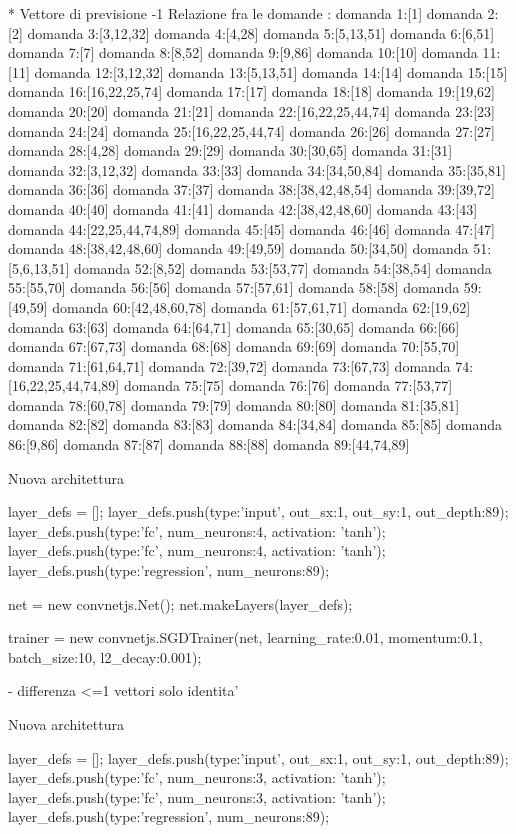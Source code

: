 * Vettore di previsione -1
Relazione fra le domande :
domanda 1:[1]
domanda 2:[2]
domanda 3:[3,12,32]
domanda 4:[4,28]
domanda 5:[5,13,51]
domanda 6:[6,51]
domanda 7:[7]
domanda 8:[8,52]
domanda 9:[9,86]
domanda 10:[10]
domanda 11:[11]
domanda 12:[3,12,32]
domanda 13:[5,13,51]
domanda 14:[14]
domanda 15:[15]
domanda 16:[16,22,25,74]
domanda 17:[17]
domanda 18:[18]
domanda 19:[19,62]
domanda 20:[20]
domanda 21:[21]
domanda 22:[16,22,25,44,74]
domanda 23:[23]
domanda 24:[24]
domanda 25:[16,22,25,44,74]
domanda 26:[26]
domanda 27:[27]
domanda 28:[4,28]
domanda 29:[29]
domanda 30:[30,65]
domanda 31:[31]
domanda 32:[3,12,32]
domanda 33:[33]
domanda 34:[34,50,84]
domanda 35:[35,81]
domanda 36:[36]
domanda 37:[37]
domanda 38:[38,42,48,54]
domanda 39:[39,72]
domanda 40:[40]
domanda 41:[41]
domanda 42:[38,42,48,60]
domanda 43:[43]
domanda 44:[22,25,44,74,89]
domanda 45:[45]
domanda 46:[46]
domanda 47:[47]
domanda 48:[38,42,48,60]
domanda 49:[49,59]
domanda 50:[34,50]
domanda 51:[5,6,13,51]
domanda 52:[8,52]
domanda 53:[53,77]
domanda 54:[38,54]
domanda 55:[55,70]
domanda 56:[56]
domanda 57:[57,61]
domanda 58:[58]
domanda 59:[49,59]
domanda 60:[42,48,60,78]
domanda 61:[57,61,71]
domanda 62:[19,62]
domanda 63:[63]
domanda 64:[64,71]
domanda 65:[30,65]
domanda 66:[66]
domanda 67:[67,73]
domanda 68:[68]
domanda 69:[69]
domanda 70:[55,70]
domanda 71:[61,64,71]
domanda 72:[39,72]
domanda 73:[67,73]
domanda 74:[16,22,25,44,74,89]
domanda 75:[75]
domanda 76:[76]
domanda 77:[53,77]
domanda 78:[60,78]
domanda 79:[79]
domanda 80:[80]
domanda 81:[35,81]
domanda 82:[82]
domanda 83:[83]
domanda 84:[34,84]
domanda 85:[85]
domanda 86:[9,86]
domanda 87:[87]
domanda 88:[88]
domanda 89:[44,74,89]


Nuova architettura

layer_defs = [];
layer_defs.push({type:'input', out_sx:1, out_sy:1, out_depth:89});
layer_defs.push({type:'fc', num_neurons:4, activation: 'tanh'});
layer_defs.push({type:'fc', num_neurons:4, activation: 'tanh'});
layer_defs.push({type:'regression', num_neurons:89});

net = new convnetjs.Net();
net.makeLayers(layer_defs);

trainer = new convnetjs.SGDTrainer(net, {learning_rate:0.01, momentum:0.1, batch_size:10, l2_decay:0.001});

- differenza <=1 vettori solo identita'

Nuova architettura

layer_defs = [];
layer_defs.push({type:'input', out_sx:1, out_sy:1, out_depth:89});
layer_defs.push({type:'fc', num_neurons:3, activation: 'tanh'});
layer_defs.push({type:'fc', num_neurons:3, activation: 'tanh'});
layer_defs.push({type:'regression', num_neurons:89});

